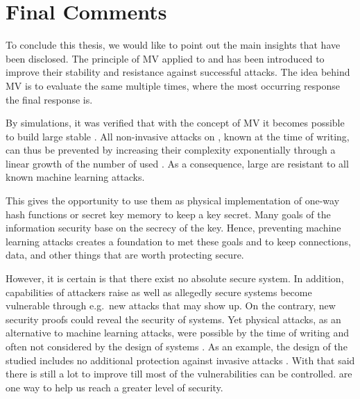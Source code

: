 
\section{Final Comments}

To conclude this thesis, we would like to point out the main insights that have been disclosed.
The principle of \ac{MV} applied to \apufs and \xpufs has been introduced to improve their stability and resistance against successful attacks.
The idea behind \ac{MV} is to evaluate the same \puf multiple times, where the most occurring response the final response is.

By simulations, it was verified that with the concept of \ac{MV} it becomes possible to build large stable \mxpufs.
All non-invasive attacks on \xpufs, known at the time of writing, can thus be prevented by increasing their complexity exponentially through a linear growth of the number of used \mpufs.
As a consequence, large \mxpufs are resistant to all known machine learning attacks.

This gives the opportunity to use them as physical implementation of one-way hash functions or secret key memory to keep a key secret.
Many goals of the information security base on the secrecy of the key.
Hence, preventing machine learning attacks creates a foundation to met these goals and to keep connections, data, and other things that are worth protecting secure.

However, it is certain is that there exist no absolute secure system.
In addition, capabilities of attackers raise as well as allegedly secure systems become vulnerable through e.g.\ new attacks that may show up.
On the contrary, new security proofs could reveal the security of systems.
Yet physical attacks, as an alternative to machine learning attacks, were possible by the time of writing and often not considered by the design of systems \cite{Tajik2014PhysicalPUFs,Tajik2015Laserfunctions}.
As an example, the design of the studied \apuf includes no additional protection against invasive attacks \cite{Tajik2015AFamily}.
With that said there is still a lot to improve till most of the vulnerabilities can be controlled.
\pufs are one way to help us reach a greater level of security.


